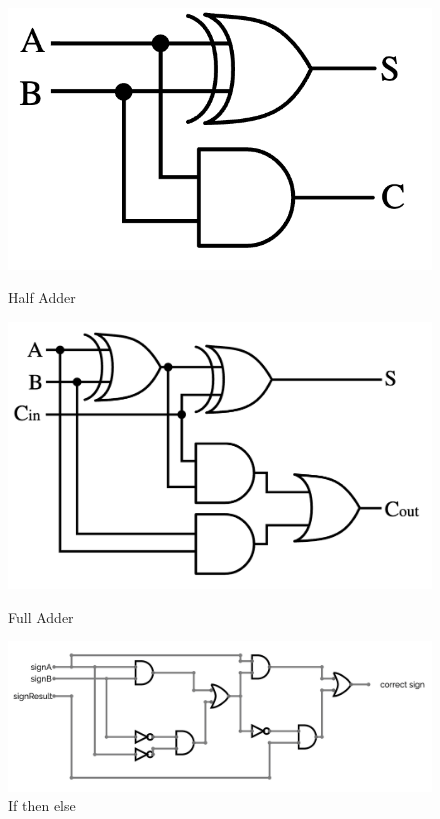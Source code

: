 \documentclass[12pt]{article}
\begin{document}
\begin{figure}[!htb]
    \begin{center}
        \begin{minipage}{0.4\textwidth}
            \centering
            \includegraphics[width=.7\linewidth]{../src/images/Half_adder.png}
            \caption{Half Adder}\label{half}
        \end{minipage}
        \hfill
        \begin{minipage}{0.4\textwidth}
            \centering
            \includegraphics[width=.8\linewidth]{../src/images/Full-adder.png}
            \caption{Full Adder}\label{full}
        \end{minipage}
        \hfill
        \begin{minipage}{0.5\textwidth}
            \centering
            \includegraphics[width=1.2\linewidth]{../src/images/overflow.png}
            \caption{If then else}\label{overflow}
        \end{minipage}
    \end{center}
\end{figure}
\end{document}
